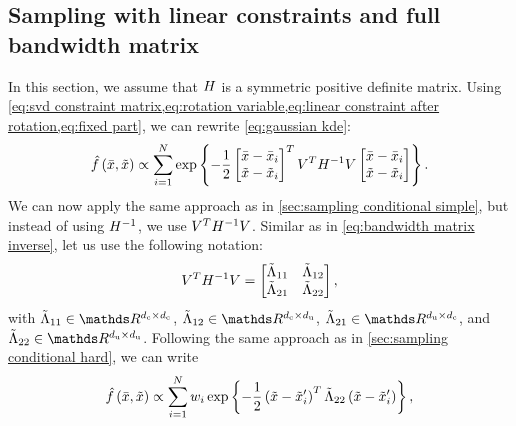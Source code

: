 \subsection{Sampling with linear constraints and full bandwidth matrix}
\label{sec:sampling constrained hard}

In this section, we assume that $H$ is a symmetric positive definite matrix. 
Using \cref{eq:svd constraint matrix,eq:rotation variable,eq:linear constraint after rotation,eq:fixed part}, we can rewrite \cref{eq:gaussian kde}:
\begin{equation}
	\hat{f}\left( \bar{x}, \tilde{x} \right) 
	\propto \sum_{i=1}^{N}
	\exp\left\{  -\frac{1}{2} 
		\begin{bmatrix} 
			\bar{x} - \bar{x}_{i} \\ 
			\tilde{x} - \tilde{x}_{i}
		\end{bmatrix}^T V^T H^{-1} V
		\begin{bmatrix} 
			\bar{x} - \bar{x}_{i} \\ 
			\tilde{x} - \tilde{x}_{i}
		\end{bmatrix}
	 \right\}.
\end{equation}
We can now apply the same approach as in \cref{sec:sampling conditional simple}, but instead of using $H^{-1}$, we use $V^T H^{-1} V$.
Similar as in \cref{eq:bandwidth matrix inverse}, let us use the following notation:
\begin{equation}
	\label{eq:rotated matrix inverse}
	V^T H^{-1} V 
	= \begin{bmatrix} \tilde{\Lambda}_{11} & \tilde{\Lambda}_{12} \\ \tilde{\Lambda}_{21} & \tilde{\Lambda}_{22} \end{bmatrix},
\end{equation}
with $\bwriul \in \realnumbers^{\dimensionparta \times \dimensionparta}$, $\bwriur \in \realnumbers^{\dimensionparta \times \dimensionpartb}$, $\bwribl \in \realnumbers^{\dimensionpartb \times \dimensionparta}$, and $\bwribr \in \realnumbers^{\dimensionpartb \times \dimensionpartb}$. Following the same approach as in \cref{sec:sampling conditional hard}, we can write
\begin{equation}
	\hat{f}\left( \bar{x}, \tilde{x} \right)
	\propto \sum_{i=1}^{N} w_{i}
	\exp\left\{  -\frac{1}{2} \left( \tilde{x} - \tilde{x}_{i}' \right)^T
		\tilde{\Lambda}_{22} \left( \tilde{x} - \tilde{x}_{i}' \right) \right\},
\end{equation}
